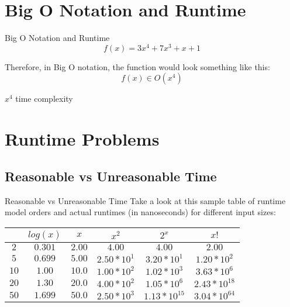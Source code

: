 \documentclass[aspectratio=169]{beamer}
\begin{document}
\section{Big O Notation and Runtime}

\begin{frame}{Big O Notation and Runtime} \pause
    \[f(x)=3x^4+7x^3+x+1\] \pause

    Therefore, in Big O notation, the function would look something like this:
    \[f(x) \in O(x^4)\] \pause \newline
    \begin{center}
        $x^4$ time complexity
    \end{center}
\end{frame}

\section{Runtime Problems}

\subsection{Reasonable vs Unreasonable Time}

\begin{frame}{Reasonable vs Unreasonable Time}
    Take a look at this sample table of runtime model orders and actual runtimes (in nanoseconds) for different input sizes:
    \begin{center}
        \begin{tabular}{ |c|c|c|c|c|c| } 
            \hline
            \mbox{} & $log(x)$ & $x$ & $x^2$ & $2^x$ & $x!$ \\
            \hline
            $2$ & $0.301$ & $2.00$ & $4.00$ & $4.00$ & $2.00$ \\
            $5$ & $0.699$ & $5.00$ & $2.50*10^1$ & $3.20*10^1$ & $1.20*10^2$ \\
            $10$ & $1.00$ & $10.0$ & $1.00*10^2$ & $1.02*10^3$ & $3.63*10^6$ \\
            $20$ & $1.30$ & $20.0$ & $4.00*10^2$ & $1.05*10^6$ & $2.43*10^{18}$ \\
            $50$ & $1.699$ & $50.0$ & $2.50*10^3$ & $1.13*10^{15}$ & $3.04*10^{64}$ \\
            \hline
        \end{tabular}
    \end{center}
\end{frame}
\end{document}
